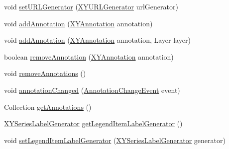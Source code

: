 \begin{DoxyCompactItemize}
\item 
void \mbox{\hyperlink{classorg_1_1jfree_1_1chart_1_1renderer_1_1xy_1_1_abstract_x_y_item_renderer_a892f5defad1225851e527b40b7913907}{set\+U\+R\+L\+Generator}} (\mbox{\hyperlink{interfaceorg_1_1jfree_1_1chart_1_1urls_1_1_x_y_u_r_l_generator}{X\+Y\+U\+R\+L\+Generator}} url\+Generator)
\item 
void \mbox{\hyperlink{classorg_1_1jfree_1_1chart_1_1renderer_1_1xy_1_1_abstract_x_y_item_renderer_a2ae40a0566352b9cf373449e1392f306}{add\+Annotation}} (\mbox{\hyperlink{interfaceorg_1_1jfree_1_1chart_1_1annotations_1_1_x_y_annotation}{X\+Y\+Annotation}} annotation)
\item 
void \mbox{\hyperlink{classorg_1_1jfree_1_1chart_1_1renderer_1_1xy_1_1_abstract_x_y_item_renderer_a497fe9e13ccf4fdeefc262af5a1cf8ff}{add\+Annotation}} (\mbox{\hyperlink{interfaceorg_1_1jfree_1_1chart_1_1annotations_1_1_x_y_annotation}{X\+Y\+Annotation}} annotation, Layer layer)
\item 
boolean \mbox{\hyperlink{classorg_1_1jfree_1_1chart_1_1renderer_1_1xy_1_1_abstract_x_y_item_renderer_af30d276ef041a1ee56bde0720edb0813}{remove\+Annotation}} (\mbox{\hyperlink{interfaceorg_1_1jfree_1_1chart_1_1annotations_1_1_x_y_annotation}{X\+Y\+Annotation}} annotation)
\item 
void \mbox{\hyperlink{classorg_1_1jfree_1_1chart_1_1renderer_1_1xy_1_1_abstract_x_y_item_renderer_a2466581dbe1a0369953ed12de5efafc5}{remove\+Annotations}} ()
\item 
void \mbox{\hyperlink{classorg_1_1jfree_1_1chart_1_1renderer_1_1xy_1_1_abstract_x_y_item_renderer_ab1d2c8ad151c3cbcea51bc417df5735f}{annotation\+Changed}} (\mbox{\hyperlink{classorg_1_1jfree_1_1chart_1_1event_1_1_annotation_change_event}{Annotation\+Change\+Event}} event)
\item 
Collection \mbox{\hyperlink{classorg_1_1jfree_1_1chart_1_1renderer_1_1xy_1_1_abstract_x_y_item_renderer_ad36b4883565657010d15fbb49f5ea9a7}{get\+Annotations}} ()
\item 
\mbox{\hyperlink{interfaceorg_1_1jfree_1_1chart_1_1labels_1_1_x_y_series_label_generator}{X\+Y\+Series\+Label\+Generator}} \mbox{\hyperlink{classorg_1_1jfree_1_1chart_1_1renderer_1_1xy_1_1_abstract_x_y_item_renderer_adb671043619b9b91070ddb7c8554618a}{get\+Legend\+Item\+Label\+Generator}} ()
\item 
void \mbox{\hyperlink{classorg_1_1jfree_1_1chart_1_1renderer_1_1xy_1_1_abstract_x_y_item_renderer_a97f408b8a3a32497f042a33ae4da36a2}{set\+Legend\+Item\+Label\+Generator}} (\mbox{\hyperlink{interfaceorg_1_1jfree_1_1chart_1_1labels_1_1_x_y_series_label_generator}{X\+Y\+Series\+Label\+Generator}} generator)

\end{DoxyCompactItemize}
